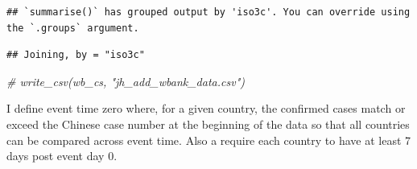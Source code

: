 \documentclass[]{article}
\newenvironment{Shaded}{\begin{snugshade}}{\end{snugshade}}
\newcommand{\CommentTok}[1]{\textcolor[rgb]{0.56,0.35,0.01}{\textit{#1}}}
\newcommand{\DataTypeTok}[1]{\textcolor[rgb]{0.13,0.29,0.53}{#1}}
\newcommand{\DecValTok}[1]{\textcolor[rgb]{0.00,0.00,0.81}{#1}}
\newcommand{\KeywordTok}[1]{\textcolor[rgb]{0.13,0.29,0.53}{\textbf{#1}}}
\newcommand{\NormalTok}[1]{#1}
\newcommand{\OperatorTok}[1]{\textcolor[rgb]{0.81,0.36,0.00}{\textbf{#1}}}
\newcommand{\StringTok}[1]{\textcolor[rgb]{0.31,0.60,0.02}{#1}}
\begin{document}
\begin{Shaded}
\end{Shaded}

\begin{verbatim}
## `summarise()` has grouped output by 'iso3c'. You can override using the `.groups` argument.
\end{verbatim}

\begin{verbatim}
## Joining, by = "iso3c"
\end{verbatim}

\begin{Shaded}
\begin{Highlighting}[]
\CommentTok{# write_csv(wb_cs, "jh_add_wbank_data.csv")}
\end{Highlighting}
\end{Shaded}

I define event time zero where, for a given country, the confirmed cases
match or exceed the Chinese case number at the beginning of the data so
that all countries can be compared across event time. Also a require
each country to have at least 7 days post event day 0.
\end{document}
